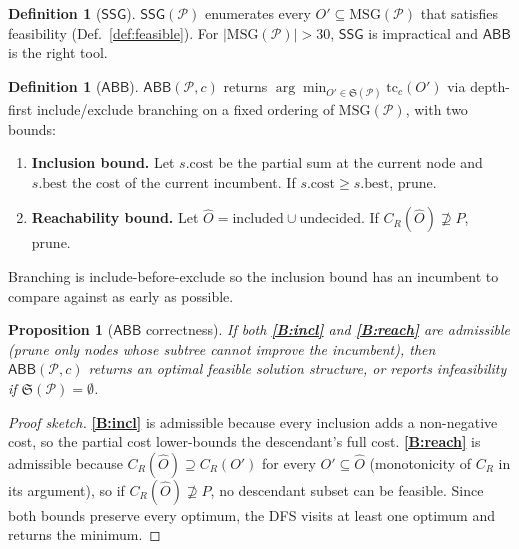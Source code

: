 \documentclass[11pt,a4paper]{article}
\theoremstyle{plain}
\newtheorem{proposition}[theorem]{Proposition}
\theoremstyle{definition}
\newtheorem{definition}[theorem]{Definition}
\newcommand{\ssg}{\textsf{SSG}}
\newcommand{\abb}{\textsf{ABB}}
\newcommand{\msgop}{\mathrm{MSG}}
\newcommand{\closer}[1]{C_R(#1)}
\begin{document}
\begin{definition}[$\ssg$]
$\ssg(\mathcal{P})$ enumerates every $O' \subseteq \msgop(\mathcal{P})$
that satisfies feasibility (Def.~\ref{def:feasible}). For
$|\msgop(\mathcal{P})| > 30$, $\ssg$ is impractical and $\abb$
is the right tool.
\end{definition}

\begin{definition}[$\abb$]
$\abb(\mathcal{P}, c)$ returns
$\arg\min_{O' \in \mathfrak{S}(\mathcal{P})} \mathrm{tc}_c(O')$
via depth-first include/exclude branching on a fixed ordering of
$\msgop(\mathcal{P})$, with two bounds:

\begin{enumerate}[label=\textbf{B\arabic*}]
\item \label{B:incl}
\textbf{Inclusion bound.} Let $s.\mathrm{cost}$ be the partial
sum at the current node and $s.\mathrm{best}$ the cost of the
current incumbent. If
$s.\mathrm{cost} \geq s.\mathrm{best}$, prune.
\item \label{B:reach}
\textbf{Reachability bound.} Let
$\widehat{O} = \mathrm{included} \cup \mathrm{undecided}$.
If $\closer{\widehat{O}} \not\supseteq P$, prune.
\end{enumerate}

Branching is include-before-exclude so the inclusion bound has
an incumbent to compare against as early as possible.
\end{definition}

\begin{proposition}[$\abb$ correctness]
\label{prop:abb-correct}
If both \textbf{\ref{B:incl}} and \textbf{\ref{B:reach}} are admissible
(prune only nodes whose subtree cannot improve the incumbent), then
$\abb(\mathcal{P}, c)$ returns an optimal feasible solution
structure, or reports infeasibility if $\mathfrak{S}(\mathcal{P}) = \emptyset$.
\end{proposition}

\begin{proof}[Proof sketch]
\textbf{\ref{B:incl}} is admissible because every inclusion adds
a non-negative cost, so the partial cost lower-bounds the
descendant's full cost. \textbf{\ref{B:reach}} is admissible
because $\closer{\widehat{O}} \supseteq \closer{O'}$ for every
$O' \subseteq \widehat{O}$ (monotonicity of $C_R$ in its argument),
so if $\closer{\widehat{O}} \not\supseteq P$, no descendant subset
can be feasible. Since both bounds preserve every optimum, the
DFS visits at least one optimum and returns the minimum.
\end{proof}
\end{document}
